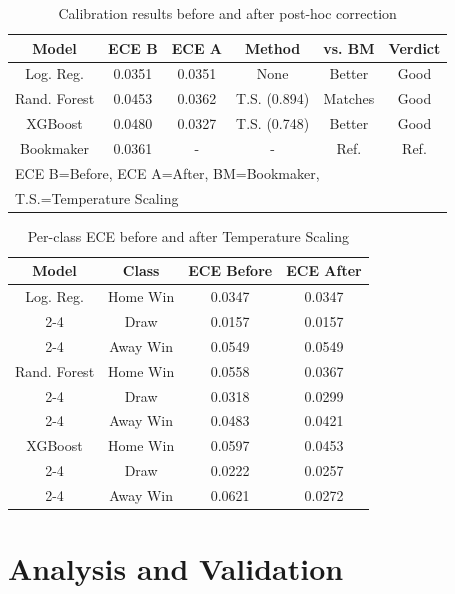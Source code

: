 \documentclass[conference]{IEEEtran}
\begin{document}
\begin{table}[htbp]
\caption{Calibration results before and after post-hoc correction}
\begin{center}
\begin{tabular}{|c|c|c|c|c|c|}
\hline
\textbf{Model} & \textbf{ECE B} & \textbf{ECE A} &
\textbf{Method} & \textbf{vs. BM} & \textbf{Verdict} \\
\hline
Log. Reg. & 0.0351 & 0.0351 & None & Better & Good \\
\hline
Rand. Forest & 0.0453 & 0.0362 & T.S. (0.894) & Matches & Good \\
\hline
XGBoost & 0.0480 & 0.0327 & T.S. (0.748) & Better & Good \\
\hline
Bookmaker & 0.0361 & - & - & Ref. & Ref. \\
\hline
\multicolumn{6}{l}{ECE B=Before, ECE A=After, BM=Bookmaker,} \\
\multicolumn{6}{l}{T.S.=Temperature Scaling}
\end{tabular}
\label{tab3}
\end{center}
\end{table}

\begin{table}[htbp]
\caption{Per-class ECE before and after Temperature Scaling}
\begin{center}
\begin{tabular}{|c|c|c|c|}
\hline
\textbf{Model} & \textbf{Class} &
\textbf{ECE Before} & \textbf{ECE After} \\
\hline
Log. Reg. & Home Win & 0.0347 & 0.0347 \\
\cline{2-4}
 & Draw & 0.0157 & 0.0157 \\
\cline{2-4}
 & Away Win & 0.0549 & 0.0549 \\
\hline
Rand. Forest & Home Win & 0.0558 & 0.0367 \\
\cline{2-4}
 & Draw & 0.0318 & 0.0299 \\
\cline{2-4}
 & Away Win & 0.0483 & 0.0421 \\
\hline
XGBoost & Home Win & 0.0597 & 0.0453 \\
\cline{2-4}
 & Draw & 0.0222 & 0.0257 \\
\cline{2-4}
 & Away Win & 0.0621 & 0.0272 \\
\hline
\end{tabular}
\label{tab4}
\end{center}
\end{table}

\section{Analysis and Validation}
\end{document}

